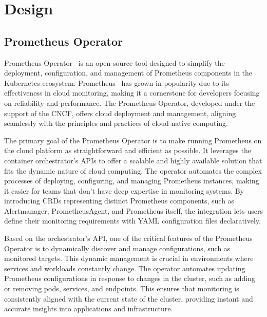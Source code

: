 
\chapter{Design}\label{chapter:design}

\section{Prometheus Operator}

Prometheus Operator~\parencite{PrometheusOperator} is an open-source tool designed to simplify the deployment, configuration, and management of Prometheus components in the Kubernetes ecosystem. Prometheus~\parencite{PrometheusMonitoringSystem} has grown in popularity due to its effectiveness in cloud monitoring, making it a cornerstone for developers focusing on reliability and performance. The Prometheus Operator, developed under the support of the \ac{CNCF}, offers cloud deployment and management, aligning seamlessly with the principles and practices of cloud-native computing. 

The primary goal of the Prometheus Operator is to make running Prometheus on the cloud platform as straightforward and efficient as possible. It leverages the container orchestrator's \ac{API}s to offer a scalable and highly available solution that fits the dynamic nature of cloud computing. The operator automates the complex processes of deploying, configuring, and managing Prometheus instances, making it easier for teams that don't have deep expertise in monitoring systems. By introducing \ac{CRD}s representing distinct Prometheus components, such as Alertmanager, PrometheusAgent, and Prometheus itself, the integration lets users define their monitoring requirements with YAML configuration files declaratively. 

Based on the orchestrator's \ac{API}, one of the critical features of the Prometheus Operator is to dynamically discover and manage configurations, such as monitored targets. This dynamic management is crucial in environments where services and workloads constantly change. The operator automates updating Prometheus configurations in response to changes in the cluster, such as adding or removing pods, services, and endpoints. This ensures that monitoring is consistently aligned with the current state of the cluster, providing instant and accurate insights into applications and infrastructure. 

